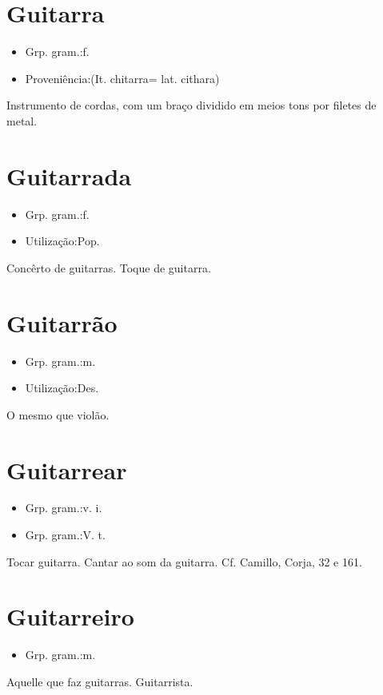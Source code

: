 \section{Guitarra}
\begin{itemize}
\item {Grp. gram.:f.}
\end{itemize}
\begin{itemize}
\item {Proveniência:(It. \textunderscore chitarra\textunderscore  = lat. \textunderscore cithara\textunderscore )}
\end{itemize}
Instrumento de cordas, com um braço dividido em meios tons por filetes de metal.
\section{Guitarrada}
\begin{itemize}
\item {Grp. gram.:f.}
\end{itemize}
\begin{itemize}
\item {Utilização:Pop.}
\end{itemize}
Concêrto de guitarras.
Toque de guitarra.
\section{Guitarrão}
\begin{itemize}
\item {Grp. gram.:m.}
\end{itemize}
\begin{itemize}
\item {Utilização:Des.}
\end{itemize}
O mesmo que \textunderscore violão\textunderscore .
\section{Guitarrear}
\begin{itemize}
\item {Grp. gram.:v. i.}
\end{itemize}
\begin{itemize}
\item {Grp. gram.:V. t.}
\end{itemize}
Tocar guitarra.
Cantar ao som da guitarra. Cf. Camillo, \textunderscore Corja\textunderscore , 32 e 161.
\section{Guitarreiro}
\begin{itemize}
\item {Grp. gram.:m.}
\end{itemize}
Aquelle que faz guitarras.
Guitarrista.
